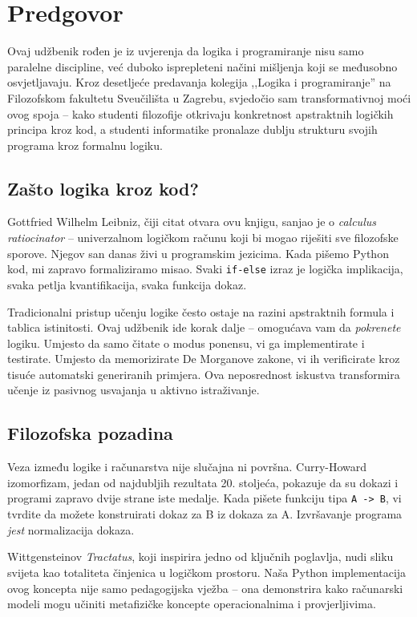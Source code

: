 \chapter*{Predgovor}

Ovaj udžbenik rođen je iz uvjerenja da logika i programiranje nisu samo paralelne discipline,
već duboko isprepleteni načini mišljenja koji se međusobno osvjetljavaju.
Kroz desetljeće predavanja kolegija ,,Logika i programiranje'' na Filozofskom fakultetu Sveučilišta u Zagrebu,
svjedočio sam transformativnoj moći ovog spoja – kako studenti filozofije otkrivaju konkretnost apstraktnih
logičkih principa kroz kod, a studenti informatike pronalaze dublju strukturu svojih programa kroz formalnu logiku.

\section*{Zašto logika kroz kod?}

Gottfried Wilhelm Leibniz, čiji citat otvara ovu knjigu, sanjao je o \textit{calculus ratiocinator} – univerzalnom logičkom računu koji bi mogao riješiti sve filozofske sporove. Njegov san danas živi u programskim jezicima. Kada pišemo Python kod, mi zapravo formaliziramo misao. Svaki \texttt{if-else} izraz je logička implikacija, svaka petlja kvantifikacija, svaka funkcija dokaz.

Tradicionalni pristup učenju logike često ostaje na razini apstraktnih formula i tablica istinitosti. Ovaj udžbenik ide korak dalje – omogućava vam da \textit{pokrenete} logiku. Umjesto da samo čitate o modus ponensu, vi ga implementirate i testirate. Umjesto da memorizirate De Morganove zakone, vi ih verificirate kroz tisuće automatski generiranih primjera. Ova neposrednost iskustva transformira učenje iz pasivnog usvajanja u aktivno istraživanje.

\section*{Filozofska pozadina}

Veza između logike i računarstva nije slučajna ni površna. Curry-Howard izomorfizam, jedan od najdubljih rezultata 20. stoljeća, pokazuje da su dokazi i programi zapravo dvije strane iste medalje. Kada pišete funkciju tipa \texttt{A -> B}, vi tvrdite da možete konstruirati dokaz za B iz dokaza za A. Izvršavanje programa \textit{jest} normalizacija dokaza.

Wittgensteinov \textit{Tractatus}, koji inspirira jedno od ključnih poglavlja, nudi sliku svijeta kao totaliteta činjenica u logičkom prostoru. Naša Python implementacija ovog koncepta nije samo pedagogijska vježba – ona demonstrira kako računarski modeli mogu učiniti metafizičke koncepte operacionalnima i provjerljivima.

